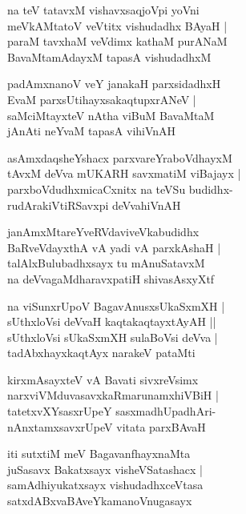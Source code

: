 \begin{shloka}
na teV tatavxM vishavxsaqjoVpi yoVni\\
meVkAMtatoV veVtitx vishudadhx BAyaH |\\
paraM tavxhaM veVdimx kathaM purANaM\\
BavaMtamAdayxM tapasA vishudadhxM
\end{shloka}

\begin{shloka}
padAmxnanoV veY janakaH parxsidadhxH\\
EvaM parxsUtihayxsakaqtupxrANeV |\\
saMciMtayxteV nAtha viBuM BavaMtaM \\
jAnAti neYvaM tapasA vihiVnAH 
\end{shloka}

\begin{shloka}
asAmxdaqsheYshacx parxvareYraboVdhayxM \\
tAvxM deVva mUKARH savxmatiM viBajayx |\\
parxboVdudhxmicaCxnitx na teVSu budidhx-\\
rudArakiVtiRSavxpi deVvahiVnAH 
\end{shloka}

\begin{shloka}
janAmxMtareYveRVdaviveVkabudidhx\\
BaRveVdayxthA vA yadi vA parxkAshaH |\\
talAlxBulubadhxsayx tu mAnuSatavxM \\
na deVvagaMdharavxpatiH shivasAsxyXtf 
\end{shloka}

\begin{shloka}
na viSunxrUpoV BagavAnusxsUkaSxmXH |\\
sUthxloVsi deVvaH kaqtakaqtayxtAyAH ||\\
sUthxloVsi sUkaSxmXH sulaBoVsi deVva |\\
tadAbxhayxkaqtAyx narakeV pataMti
\end{shloka}

\begin{shloka}
kirxmAsayxteV vA Bavati sivxreVsimx\\
narxviVMduvasavxkaRmarunamxhiVBiH |\\
tatetxvXYsasxrUpeY sasxmadhUpadhAri-\\
nAnxtamxsavxrUpeV vitata parxBAvaH
\end{shloka}

\begin{shloka}
iti sutxtiM meV BagavanfhayxnaMta\\
juSasavx Bakatxsayx visheVSatashacx |\\
samAdhiyukatxsayx vishudadhxceVtasa\\
satxdABxvaBAveYkamanoVnugasayx
\end{shloka}

